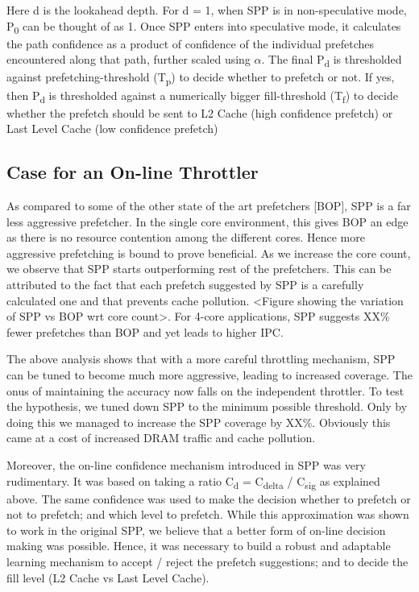 \documentclass{sig-alternate}
\begin{document}
Here d is the lookahead depth. 
For d = 1, when SPP is in non-speculative mode, P\textsubscript{0} can be thought of as 1. 
Once SPP enters into speculative mode, it calculates the path confidence as a product of confidence of the individual prefetches encountered along that path, further scaled using $\alpha$. 
The final P\textsubscript{d} is thresholded against prefetching-threshold (T\textsubscript{p}) to decide whether to prefetch or not. 
If yes, then P\textsubscript{d} is thresholded against a numerically bigger fill-threshold (T\textsubscript{f}) to decide whether the prefetch should be sent to L2 Cache (high confidence prefetch) or Last Level Cache (low confidence prefetch)

\subsection{Case for an On-line Throttler}
As compared to some of the other state of the art prefetchers [BOP], SPP is a far less aggressive prefetcher. 
In the single core environment, this gives BOP an edge as there is no resource contention among the different cores. 
Hence more aggressive prefetching is bound to prove beneficial. 
As we increase the core count, we observe that SPP starts outperforming rest of the prefetchers. 
This can be attributed to the fact that each prefetch suggested by SPP is a carefully calculated one and that prevents cache pollution. <Figure showing the variation of SPP vs BOP wrt core count>. 
For 4-core applications, SPP suggests XX\% fewer prefetches than BOP and yet leads to higher IPC.

The above analysis shows that with a more careful throttling mechanism, SPP can be tuned to become much more aggressive, leading to increased coverage. 
The onus of maintaining the accuracy now falls on the independent throttler. 
To test the hypothesis, we tuned down SPP to the minimum possible threshold. 
Only by doing this we managed to increase the SPP coverage by XX\%. 
Obviously this came at a cost of increased DRAM traffic and cache pollution. 

Moreover, the on-line confidence mechanism introduced in SPP was very rudimentary.
It was based on taking a ratio C\textsubscript{d} = C\textsubscript{delta} / C\textsubscript{sig} as explained above.
The same confidence was used to make the decision whether to prefetch or not to prefetch; and which level to prefetch.
While this approximation was shown to work in the original SPP, we believe that a better form of on-line decision making was possible.
Hence, it was necessary to build a robust and adaptable learning mechanism to accept / reject the prefetch suggestions; and to decide the fill level (L2 Cache vs Last Level Cache).
\end{document}
